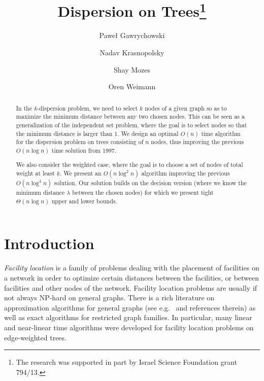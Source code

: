 \documentclass[a4paper,UKenglish]{lipics-v2016}
\title{Dispersion on Trees\protect \thanks{The research was supported in part by Israel Science Foundation grant 794/13.}}
\author[1]{Pawe\l{} Gawrychowski}
\author[1]{Nadav Krasnopolsky}
\author[2]{Shay Mozes}
\author[1]{Oren Weimann}
\affil[1]{University of Haifa, Israel}
\affil[2]{IDC Herzliya, Israel}
\theoremstyle{plain}
\newcommand{\Oh}{{O}}
\begin{document}
\maketitle

\begin{abstract}
In the $k$-dispersion problem, we need to select $k$ nodes of a given graph so as to maximize
the minimum distance between any two chosen nodes. This can be seen as a generalization
of the independent set problem, where the goal is to select nodes so that the minimum distance
is larger than 1.
We design an optimal $\Oh(n)$ time algorithm for the dispersion problem on trees consisting
of $n$ nodes, thus improving the previous  $\Oh(n\log n)$ time solution from 1997. 

We also consider the weighted case, where the goal is to choose a set of nodes of total weight at least $k$. We present an $\Oh(n\log^2n)$ algorithm improving the previous $\Oh(n\log^4 n)$ solution. Our solution builds on the decision version (where we know the minimum distance $\lambda$ between the chosen nodes) for which we present tight $\Theta(n\log n)$ upper and lower bounds. 
\end{abstract}

\section{Introduction}

\emph{Facility location} is a family of problems dealing with the placement of facilities on a network in order to optimize certain distances between the facilities, or between facilities and other nodes of the network. Facility location problems are usually if not always NP-hard on general graphs. There is a rich literature on approximation algorithms for general graphs (see e.g.~\cite{DavidB.Shmoys1997,Vazirani2003} and references therein) as well as exact algorithms for restricted graph families. In particular, many linear and near-linear time algorithms were developed for facility location problems on edge-weighted trees.   
\end{document}
